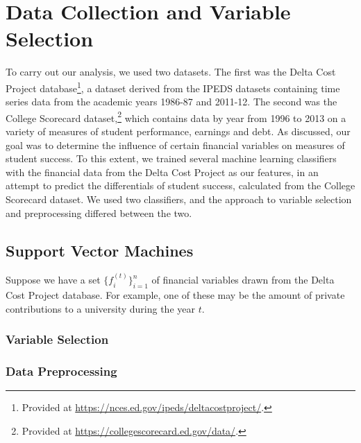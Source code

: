 \documentclass[paper.tex]{subfiles}
\begin{document}
\section{Data Collection and Variable Selection}
To carry out our analysis, we used two datasets. The first was the Delta Cost Project database\footnote{Provided at \url{https://nces.ed.gov/ipeds/deltacostproject/}.}, a dataset derived from the IPEDS datasets containing time series data from the academic years 1986-87 and 2011-12. The second was the College Scorecard dataset,\footnote{Provided at \url{https://collegescorecard.ed.gov/data/}.} which contains data by year from 1996 to 2013 on a variety of measures of student performance, earnings and debt. As discussed, our goal was to determine the influence of certain financial variables on measures of student success. To this extent, we trained several machine learning classifiers with the financial data from the Delta Cost Project as our features, in an attempt to predict the differentials of student success, calculated from the College Scorecard dataset. We used two classifiers, and the approach to variable selection and preprocessing differed between the two.

\subsection{Support Vector Machines} 
Suppose we have a set $\{ f_i^{(t)} \}_{i = 1}^n$ of financial variables drawn from the Delta Cost Project database. For example, one of these may be the amount of private contributions to a university during the year $t$.  
\subsubsection{Variable Selection} 
\subsubsection{Data Preprocessing}
	
\end{document}
